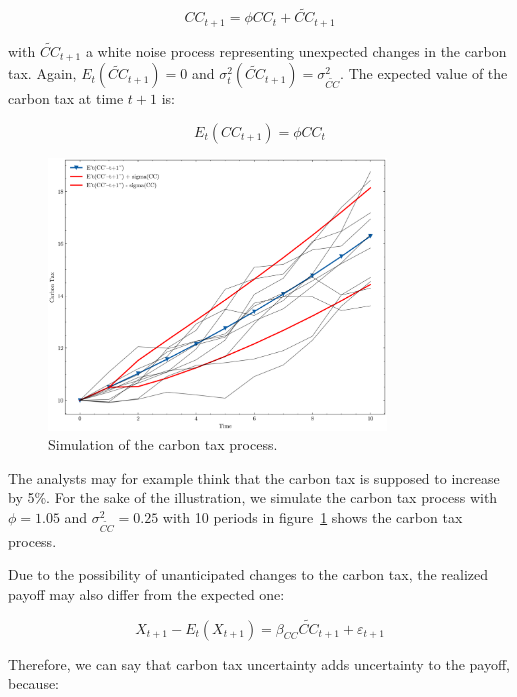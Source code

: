 \begin{equation}
    CC_{t+1} = \phi CC_t + \tilde{CC}_{t+1}
\end{equation}

with $\tilde{CC}_{t+1}$ a white noise process
representing unexpected changes in the carbon tax.
Again, $E_t(\tilde{CC}_{t+1}) = 0$ and
$\sigma_t^2(\tilde{CC}_{t+1}) = \sigma_{\tilde{CC}}^2$.
The expected value of the carbon tax at time $t+1$ is:

\begin{equation}
    E_t(CC_{t+1}) = \phi CC_t
\end{equation}


\begin{figure}[htbp]
    \centering
    \includegraphics[width=0.8\textwidth]{../images/chapter01/carbon_tax_simulations.png}
    \caption{Simulation of the carbon tax process.}
    \label{fig:carbon_tax}
\end{figure}

The analysts may for example think that the carbon 
tax is supposed to increase by 5\%.
For the sake of the illustration, 
we simulate the carbon tax process with
$\phi = 1.05$ and $\sigma_{\tilde{CC}}^2 = 0.25$
with 10 periods
in figure~\ref{fig:carbon_tax} shows the carbon tax process.



Due to the possibility of unanticipated changes 
to the carbon tax,
the realized payoff may also differ from the expected one:

\begin{equation}
    X_{t+1} - E_{t}(X_{t+1}) = \beta_{CC} \tilde{CC}_{t+1} + \varepsilon_{t+1}
\end{equation}

Therefore, we can say that 
carbon tax uncertainty adds uncertainty to the
payoff, because:


